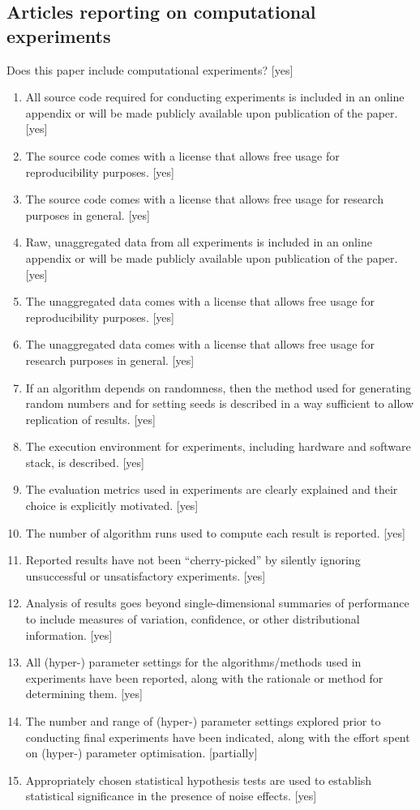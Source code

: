 \documentclass[]{jair}
\begin{document}
\subsection*{Articles reporting on computational experiments}
Does this paper include computational experiments? [yes]
\begin{enumerate}
    \item All source code required for conducting experiments is included in an online appendix or will be made publicly available upon publication of the paper. [yes]
    \item The source code comes with a license that allows free usage for reproducibility purposes. [yes]
    \item The source code comes with a license that allows free usage for research purposes in general. [yes]
    \item Raw, unaggregated data from all experiments is included in an online appendix or will be made publicly available upon publication of the paper. [yes]
    \item The unaggregated data comes with a license that allows free usage for reproducibility purposes. [yes]
    \item The unaggregated data comes with a license that allows free usage for research purposes in general. [yes]
    \item If an algorithm depends on randomness, then the method used for generating random numbers and for setting seeds is described in a way sufficient to allow replication of results. [yes]
    \item The execution environment for experiments, including hardware and software stack, is described. [yes]
    \item The evaluation metrics used in experiments are clearly explained and their choice is explicitly motivated. [yes]
    \item The number of algorithm runs used to compute each result is reported. [yes]
    \item Reported results have not been ``cherry-picked'' by silently ignoring unsuccessful or unsatisfactory experiments. [yes]
    \item Analysis of results goes beyond single-dimensional summaries of performance to include measures of variation, confidence, or other distributional information. [yes]
    \item All (hyper-) parameter settings for the algorithms/methods used in experiments have been reported, along with the rationale or method for determining them. [yes]
    \item The number and range of (hyper-) parameter settings explored prior to conducting final experiments have been indicated, along with the effort spent on (hyper-) parameter optimisation. [partially]
    \item Appropriately chosen statistical hypothesis tests are used to establish statistical significance in the presence of noise effects. [yes]
\end{enumerate}
\end{document}
